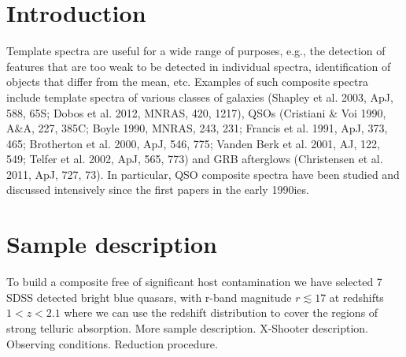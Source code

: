 \documentclass[iop]{emulateapj}
\begin{document}


\section{Introduction}

Template spectra are useful for a wide range of purposes, e.g., the detection of features that are too weak to be detected in individual spectra, identification of objects that differ from the mean, etc. Examples of such composite spectra include template spectra of various classes of galaxies (Shapley et al. 2003, ApJ, 588, 65S; Dobos et al. 2012, MNRAS, 420, 1217), QSOs (Cristiani \& Voi 1990, A\&A, 227, 385C; Boyle 1990, MNRAS, 243, 231; Francis et al. 1991, ApJ, 373, 465; Brotherton et al. 2000, ApJ, 546, 775; Vanden Berk et al. 2001, AJ, 122, 549; Telfer et al. 2002, ApJ, 565, 773) and GRB afterglows (Christensen et al. 2011, ApJ, 727, 73). In particular, QSO composite spectra have been studied and discussed intensively since the first papers in the early 1990ies.


\section{Sample description}
To build a composite free of significant host contamination we have selected 7 SDSS detected bright blue quasars, with r-band magnitude $r \lesssim 17$ at redshifts $1 < z < 2.1$ where we can use the redshift distribution to cover the regions of strong telluric absorption. More sample description. X-Shooter description. Observing conditions. Reduction procedure. 




\newcommand\sk[2]{Sk\,{$-#1{^\circ}#2$}}
\newcommand\tnc{\,\tablenotemark{c}}
\newcommand\tnd{\,\tablenotemark{d}}
\end{document}
